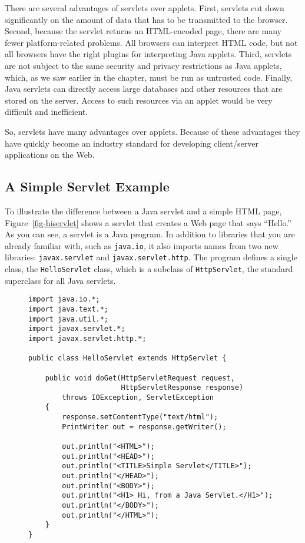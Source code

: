 There are several advantages of servlets over applets. First, servlets
cut down significantly on the amount of data that has to be
transmitted to the browser. Second, because the
servlet returns an HTML-encoded page, there are many fewer
platform-related problems.  All browsers can interpret HTML code, but
not all browsers have the right plugins for interpreting Java applets.
Third, servlets are not subject to the same security and privacy
restrictions as Java applets, which, as we saw earlier in the chapter,
must be run as untrusted code.  Finally, Java servlets can directly
access large databases and other resources that are stored on the
server.  Access to such resources via an applet would be very
difficult and inefficient.

So, servlets have many advantages over applets. Because of these
advantages they have quickly become an industry standard for
developing client/server applications on the Web.

\subsection{A Simple Servlet Example}

To illustrate the difference between a Java servlet and a simple HTML
page, Figure~\ref{fig-hiservlet} shows a servlet that creates a
Web page that says ``Hello.''  As you can see, a servlet is a
Java program. In addition to libraries that you are already familiar
with, such as {\tt java.io}, it also imports names from two new
libraries: {\tt javax.servlet} and {\tt javax.servlet.http}.  The
program defines a single class, the {\tt HelloServlet} class, which is
a subclass of {\tt HttpServlet}, the standard superclass for all Java
servlets.  

\begin{figure}[tb]
\jjjprogstart
\begin{jjjlisting}
\begin{lstlisting}
import java.io.*;
import java.text.*;
import java.util.*;
import javax.servlet.*;
import javax.servlet.http.*;

public class HelloServlet extends HttpServlet {

    public void doGet(HttpServletRequest request,
                      HttpServletResponse response)
        throws IOException, ServletException
    {
        response.setContentType("text/html");
        PrintWriter out = response.getWriter();

        out.println("<HTML>");
        out.println("<HEAD>");
        out.println("<TITLE>Simple Servlet</TITLE>");
        out.println("</HEAD>");
        out.println("<BODY>");
        out.println("<H1> Hi, from a Java Servlet.</H1>");
        out.println("</BODY>");
        out.println("</HTML>");
    }
}

\end{lstlisting}
\end{jjjlisting}
\end{figure}

